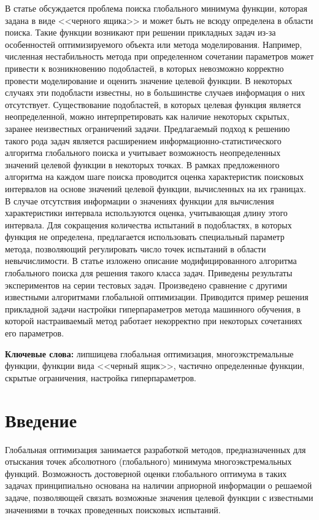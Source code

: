 \documentclass[a4paper,12pt,russian]{article}
\begin{document}
\newline
\begin{small}
В статье обсуждается проблема поиска глобального минимума функции, которая задана в виде <<черного ящика>> и может быть не всюду определена в области поиска. Такие функции возникают при решении прикладных задач из-за особенностей оптимизируемого объекта или метода моделирования. Например, численная нестабильность метода при определенном сочетании параметров может привести к возникновению подобластей, в которых невозможно корректно провести моделирование и оценить значение целевой функции. В некоторых случаях эти подобласти известны, но в большинстве случаев информация о них отсутствует. Существование подобластей, в которых целевая функция является неопределенной, можно интерпретировать как наличие некоторых скрытых, заранее неизвестных ограничений задачи. Предлагаемый подход к решению такого рода задач является расширением информационно-статистического алгоритма глобального поиска и учитывает возможность неопределенных значений целевой функции в некоторых точках. 
В рамках предложенного алгоритма на каждом шаге поиска проводится оценка характеристик поисковых интервалов на основе значений целевой функции, вычисленных на их границах. 
В случае отсутствия информации о значениях функции для вычисления характеристики интервала используются оценка, учитывающая длину этого интервала. Для сокращения количества испытаний в подобластях, в которых функция не определена, предлагается использовать специальный параметр метода, позволяющий регулировать число точек испытаний в области невычислимости. В статье изложено описание модифицированного алгоритма глобального поиска для решения такого класса задач. Приведены результаты экспериментов на серии тестовых задач. Произведено сравнение с другими известными алгоритмами глобальной оптимизации. Приводится пример решения прикладной задачи настройки гиперпараметров метода машинного обучения, в которой настраиваемый метод работает некорректно при некоторых сочетаниях его параметров.


\textbf{Ключевые слова:} липшицева глобальная оптимизация, многоэкстремальные функции, функции вида <<черный ящик>>, частично определенные функции, скрытые ограничения, настройка гиперпараметров.
\end{small}

\section{Введение}
Глобальная оптимизация занимается разработкой методов, предназначенных для отыскания точек абсолютного (глобального) минимума многоэкстремальных функций. Возможность достоверной оценки глобального оптимума в таких задачах принципиально основана на наличии априорной информации о решаемой задаче, позволяющей связать возможные значения целевой функции с известными значениями в точках проведенных поисковых испытаний.
\end{document}
